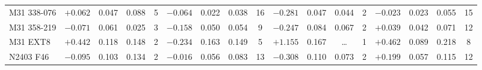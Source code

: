 \documentclass{aa}
\begin{document}
\begin{appendix}
\begin{table*}
\begin{adjustbox}{width=1\textwidth}
{\begin{tabular}{l cccccccccccccccc}
M31 338-076   & $+0.062$ & 0.047 & 0.088 & 5 & $-0.064$ & 0.022 & 0.038 & 16 & $-0.281$ & 0.047 & 0.044 & 2 & $-0.023$ & 0.023 & 0.055 & 15 \\
M31 358-219   & $-0.071$ & 0.061 & 0.025 & 3 & $-0.158$ & 0.050 & 0.054 & 9 & $-0.247$ & 0.084 & 0.067 & 2 & $+0.039$ & 0.042 & 0.071 & 12 \\
M31 EXT8      & $+0.442$ & 0.118 & 0.148 & 2 & $-0.234$ & 0.163 & 0.149 & 5 & $+1.155$ & 0.167 & \ldots & 1 & $+0.462$ & 0.089 & 0.218 & 8 \\
N2403 F46     & $-0.095$ & 0.103 & 0.134 & 2 & $-0.016$ & 0.056 & 0.083 & 13 & $-0.308$ & 0.110 & 0.073 & 2 & $+0.199$ & 0.057 & 0.115 & 12 \\
\hline
\end{tabular}
}
\end{adjustbox}
\end{table*}


\end{appendix}
\end{document}
